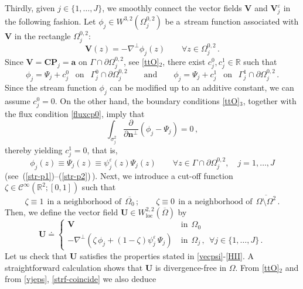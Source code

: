 \documentclass[11pt]{article}
\numberwithin{equation}{section}
\numberwithin{figure}{section}
\def\loc{{\mathrm{loc}}}
\def\n{{\mathbf n}}
\begin{document}
Thirdly, given $j \in \{1,\dots, J\}$, we smoothly connect the vector fields $\mathbf{V}$ and $\mathbf{V}^{\varepsilon}_{j}$ in the following
fashion. Let $\phi_{j} \in W^{3,2}(\Omega_j^{0,2})$ be a~stream function associated with $\mathbf{V}$ in the rectangle $\Omega_j^{0,2}$:
$$
\mathbf{V}(z) = - \nabla^{\perp} \phi_{j}(z)  \qquad \forall z \in \Omega^{0,2}_{j} \, .
$$
Since $\mathbf{V} = \mathbf{CP}_{j} = \mathbf{a}$ on $\Gamma \cap \partial \Omega^{0,2}_{j}$, see \eqref{ttO}$_2$, there
exist $c^{0}_{j}, c^{1}_{j} \in \mathbb{R}$ such that
$$
\phi_{j} = \Psi_{j} + c^{0}_{j} \ \ \text{ on } \ \ \Gamma_j^{0} \cap \partial \Omega^{0,2}_{j} \qquad \text{and} \qquad \phi_{j} = \Psi_{j} + c^{1}_{j} \ \ \text{ on } \ \ \Gamma_j^{1} \cap \partial \Omega^{0,2}_{j} \, .
$$
Since the stream function $\phi_{j}$ can be modified up to an additive constant, we can assume $c^{0}_{j} = 0$. On the other hand,
the boundary conditions \eqref{ttO}$_3$, together with the flux condition \eqref{fluxcp0}, imply that
$$
\int_{\sigma_j^2} \dfrac{\partial}{\partial \n^{\perp}} (\phi_{j} - \Psi_{j}) = 0 \, ,
$$
thereby yielding $c^{1}_{j} = 0$, that is, 
\begin{equation}\label{strf-coincide}
\phi_{j}(z) \equiv \Psi_{j}(z)\equiv \psi_{j}^{\varepsilon}(z)  \Psi_{j}(z) \qquad\forall z\in\Gamma \cap \partial \Omega^{0,2}_{j}, \quad j=1,\dots, J
\end{equation}
(see~(\ref{str-p1})--(\ref{str-p2})\,). Next, we introduce
a cut-off function $\zeta \in \mathcal{C}^{\infty}(\mathbb{R}^2; [0,1])$ such that
$$
\zeta \equiv 1 \ \ \text{in a neighborhood of} \ \ \overline{\Omega_{0}} \, ; \qquad \zeta \equiv 0 \ \ \text{in a neighborhood of} \ \ \overline{\Omega \setminus \Omega^2} \, .
$$
Then, we define the vector field $\mathbf{U} \in W^{2,2}_{\loc}(\overline\Omega)$ by
\begin{equation}
  \mathbf{U} \doteq \begin{cases}
  \mathbf{V} & \ \mathrm{ in } \ \ \Omega_0  \\[4pt]
  - \nabla^{\perp} (\zeta \, \phi_{j} + (1 - \zeta) \psi_{j}^{\varepsilon} \, \Psi_{j} ) & \ \mathrm{ in }  \ \ \Omega_j \, , \ \ \forall j \in \{ 1,\dots,J\} \, .
  \end{cases}
\end{equation}
Let us check that $\mathbf{U}$ satisfies the properties stated in \eqref{vecpsi}-\eqref{HII}. A straightforward calculation shows that $\mathbf{U}$ is divergence-free in $\Omega$. From \eqref{ttO}$_2$ and from \eqref{vjeps},  \eqref{strf-coincide} we also deduce 
\end{document}
